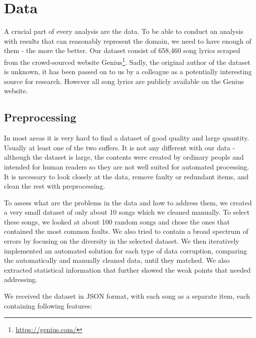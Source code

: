 \chapter{Data}

A crucial part of every analysis are the data. To be able to conduct an analysis with results that can reasonably represent the domain, we need to have enough of them - the more the better. Our dataset consist of 658,460 song lyrics scraped from the crowd-sourced website Genius\footnote{\url{https://genius.com/}}. Sadly, the original author of the dataset is unknown, it has been passed on to us by a colleague as a potentially interesting source for research. However all song lyrics are publicly available on the Genius website.

\section{Preprocessing}

In most areas it is very hard to find a dataset of good quality and large quantity. Usually at least one of the two suffers. It is not any different with our data - although the dataset is large, the contents were created by ordinary people and intended for human readers so they are not well suited for automated processing. It is necessary to look closely at the data, remove faulty or redundant items, and clean the rest with preprocessing.

To assess what are the problems in the data and how to address them, we created a very small dataset of only about 10 songs which we cleaned manually. To select these songs, we looked at about 100 random songs and chose the ones that contained the most common faults. We also tried to contain a broad spectrum of errors by focusing on the diversity in the selected dataset. We then iteratively implemented an automated solution for each type of data corruption, comparing the automatically and manually cleaned data, until they matched. We also extracted statistical information that further showed the weak points that needed addressing.

We received the dataset in JSON format, with each song as a separate item, each containing following features:

